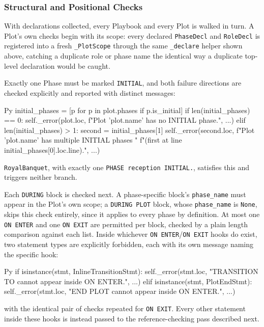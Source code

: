 \subsubsection{Structural and Positional Checks}
With declarations collected, every Playbook and every Plot is walked in turn. A Plot's own checks begin with its scope: every declared \lstinline|PhaseDecl| and \lstinline|RoleDecl| is registered into a fresh \lstinline|_PlotScope| through the same \lstinline|_declare| helper shown above, catching a duplicate role or phase name the identical way a duplicate top-level declaration would be caught.

Exactly one Phase must be marked \lstinline|INITIAL|, and both failure directions are checked explicitly and reported with distinct messages:
\begin{codeblock}[]{Py}
initial_phases = [p for p in plot.phases if p.is_initial]
if len(initial_phases) == 0:
    self._error(plot.loc, f"Plot '{plot.name}' has no INITIAL phase.", ...)
elif len(initial_phases) > 1:
    second = initial_phases[1]
    self._error(second.loc, f"Plot '{plot.name}' has multiple INITIAL phases "
        f"(first at line {initial_phases[0].loc.line}).", ...)
\end{codeblock}
\lstinline|RoyalBanquet|, with exactly one \lstinline|PHASE reception INITIAL.|, satisfies this and triggers neither branch.

Each \lstinline|DURING| block is checked next. A phase-specific block's \lstinline|phase_name| must appear in the Plot's own scope; a \lstinline|DURING PLOT| block, whose \lstinline|phase_name| is \lstinline|None|, skips this check entirely, since it applies to every phase by definition. At most one \lstinline|ON ENTER| and one \lstinline|ON EXIT| are permitted per block, checked by a plain length comparison against each list. Inside whichever \lstinline|ON ENTER|/\lstinline|ON EXIT| hooks do exist, two statement types are explicitly forbidden, each with its own message naming the specific hook:
\begin{codeblock}[]{Py}
if isinstance(stmt, InlineTransitionStmt):
    self._error(stmt.loc, "TRANSITION TO cannot appear inside ON ENTER.", ...)
elif isinstance(stmt, PlotEndStmt):
    self._error(stmt.loc, "END PLOT cannot appear inside ON ENTER.", ...)
\end{codeblock}
with the identical pair of checks repeated for \lstinline|ON EXIT|. Every other statement inside these hooks is instead passed to the reference-checking pass described next.

